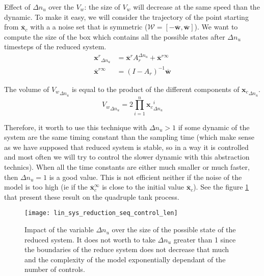 Effect of $\Delta n_u$ over the $V_w$: the size of $V_w$ will decrease at the same speed than the dynamic. To make it easy, we will consider the trajectory of the point starting from $\overline{\mathbf{x}}_c$ with a a noise set that is symmetric ($\mathcal{W} = \left [ -\overline{\mathbf{w}},\overline{\mathbf{w}} \right ]$). We want to compute the size of the box which contains all the possible states after $\Delta n_u$ timesteps of the reduced system.
\begin{equation}
\begin{split}
{\mathbf{x}^r}_{\Delta n_u} &= \overline{\mathbf{x}}^r A_r^{\Delta n_u} + \overline{\mathbf{x}}^{r \infty}\\
\overline{\mathbf{x}}^{r \infty} &= (I-A_r)^{-1}\overline{\mathbf{w}}
\end{split}
\end{equation}

The volume of ${V_w}_{\Delta n_u}$ is equal to the product of the different components of ${\mathbf{x}_c}_{\Delta n_u}$.
\begin{equation}
{V_w}_{\Delta n_u} = 2 \prod_{i=1}^n
{\mathbf{x}_c}_{\Delta n_u}^i
\end{equation}

Therefore, it worth to use this technique with $\Delta n_u>1$ if some dynamic of the system are the same timing constant than the sampling time (which make sense as we have supposed that reduced system is stable, so in a way it is controlled and most often we will try to control the slower dynamic with this abstraction technics). When all the time constants are either much smaller or much faster, then $\Delta n_u = 1$ is a good value.
This is not efficient neither if the noise of the model is too high (ie if the $\overline{\mathbf{x}}_c^{\infty}$ is close to the initial value $\overline{\mathbf{x}}_c$). See the figure \ref{reduced_system_bounds} that present these result on the quadruple tank process.


\begin{figure}[!ht]
  \centering
  \texttt{[image: lin\_sys\_reduction\_seq\_control\_len]}
  \caption{Impact of the variable $\Delta n_u$ over the size of the possible state of the reduced system. It does not worth to take $\Delta n_u$ greater than 1 since the boundaries of the reduce system does not decrease that much and the complexity of the model exponentially dependant of the number of controls.}
  \label{reduced_system_bounds}
\end{figure}


